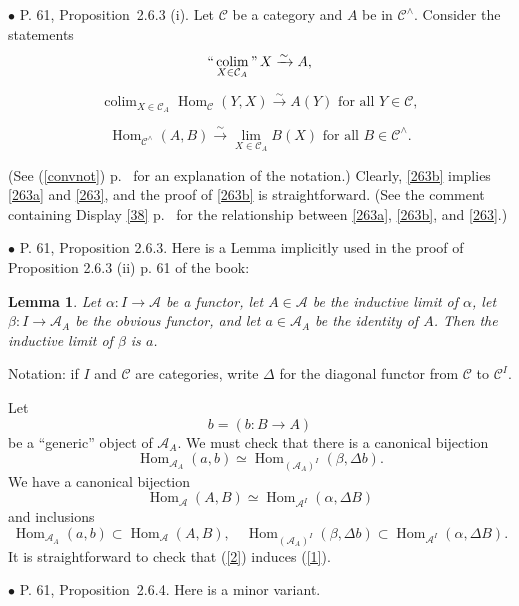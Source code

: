 \documentclass[12pt]{article}
\newtheorem{lem}[thm]{Lemma}
\theoremstyle{remark}%
\newcommand{\bu}{\bullet}
\newcommand{\n}{\noindent}
\newcommand{\A}{\mathcal A}
\newcommand{\C}{\mathcal C}
\newcommand{\pr}{Proposition}
\newcommand{\cn}{(See (\ref{convnot}) p.~\pageref{convnot} for an explanation of the notation.) }
\DeclareMathOperator*{\coli}{colim}
\DeclareMathOperator*{\co}{colim}
\DeclareMathOperator*{\ic}{``\coli"}
\DeclareMathOperator{\Hom}{Hom}
\DeclareMathOperator{\h}{Hom}
\begin{document}

\n$\bu$ P. 61, \pr\ 2.6.3 (i). Let $\C$ be a category and $A$ be in $\C^\wedge$. Consider the statements  
% 
\begin{equation}\label{263a}
\ic_{X\in\C_A}X\xrightarrow\sim A, 
\end{equation} 

\begin{equation}\label{263b}
\co_{X\in\C_A}\h_\C(Y,X)\xrightarrow\sim A(Y)\text{ for all }Y\in\C, 
\end{equation}

\begin{equation}\label{263} 
\h_{\C^\wedge}(A,B)\xrightarrow\sim\lim_{X\in\C_A}B(X)\text{ for all }B\in\C^\wedge. 
\end{equation} 

\n\cn Clearly, \eqref{263b} implies \eqref{263a} and \eqref{263}, and the proof of \eqref{263b} is straightforward. (See the comment containing Display \eqref{38} p.~\pageref{38} for the relationship between \eqref{263a}, \eqref{263b}, and \eqref{263}.) 


\n$\bu$ P. 61, Proposition 2.6.3. Here is a Lemma implicitly used in the proof of Proposition 2.6.3 (ii) p. 61 of the book: 
% 
\begin{lem} 
Let $\alpha:I\to\A$ be a functor, let $A\in\A$ be the inductive limit of $\alpha$, let $\beta:I\to\A_A$ be the obvious functor, and let $a\in\A_A$ be the identity of $A$. Then the inductive limit of $\beta$ is $a$. 
\end{lem} 
%
\n{\em Proof.} Notation: if $I$ and $\C$ are categories, write $\Delta$ for the diagonal functor from $\C$ to $\C^I$. 

Let
$$
b=(b:B\to A)
$$
be a ``generic'' object of $\A_A$. We must check that there is a canonical bijection
%
\begin{equation}\label{1}
\Hom_{\A_A}(a,b)\simeq\Hom_{(\A_A)^I}(\beta,\Delta b).
\end{equation}
%
We have a canonical bijection  
%
\begin{equation}\label{2}
\Hom_\A(A,B)\simeq\Hom_{\A^I}(\alpha,\Delta B)
\end{equation}
%
and inclusions  
$$
\Hom_{\A_A}(a,b)\subset\Hom_\A(A,B),\quad
%
\Hom_{(\A_A)^I}(\beta,\Delta b)\subset\Hom_{\A^I}(\alpha,\Delta B).
$$
It is straightforward to check that (\ref{2}) induces (\ref{1}). 


\n$\bu$ P. 61, \pr\ 2.6.4. Here is a minor variant. 
\end{document}
